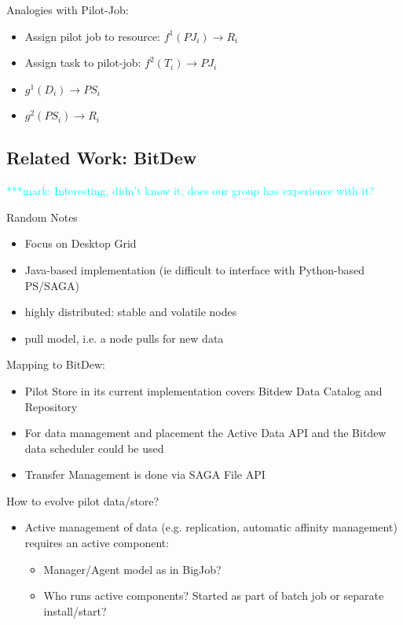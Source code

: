 \documentclass[]{article}
\newcommand{\msnote}[1]{ {\textcolor{cyan} { ***mark: #1 }}}
\begin{document}
\noindent
Analogies with Pilot-Job:
\begin{itemize}
	\item Assign pilot job to resource: $f^{1}(PJ_i) \rightarrow R_i$
	\item Assign task to pilot-job: $f^{2}(T_i) \rightarrow PJ_i$ 

	\item $g^{1} (D_i) \rightarrow PS_i$
	\item $g^{2} (PS_i) \rightarrow R_i$
\end{itemize}

\subsection{Related Work: BitDew}
\msnote{Interesting, didn't know it, does our group has experience with it?}

Random Notes
\begin{itemize}
	\item Focus on Desktop Grid
	\item Java-based implementation (ie difficult to interface with Python-based PS/SAGA)
	\item highly distributed: stable and volatile nodes
	\item pull model, i.e. a node pulls for new data
\end{itemize}


Mapping to BitDew:
\begin{itemize}
	\item Pilot Store in its current implementation covers Bitdew Data Catalog and Repository
	\item For data management and placement the Active Data API and the Bitdew data scheduler could be used
	\item Transfer Management is done via SAGA File API	
\end{itemize}

How to evolve pilot data/store?
\begin{itemize}
	\item Active management of data (e.g. replication, automatic affinity management) requires an active component:
	\begin{itemize}
		\item Manager/Agent model as in BigJob?
		\item Who runs active components? Started as part of batch job or separate install/start?
	\end{itemize}
\end{itemize}
\end{document}
